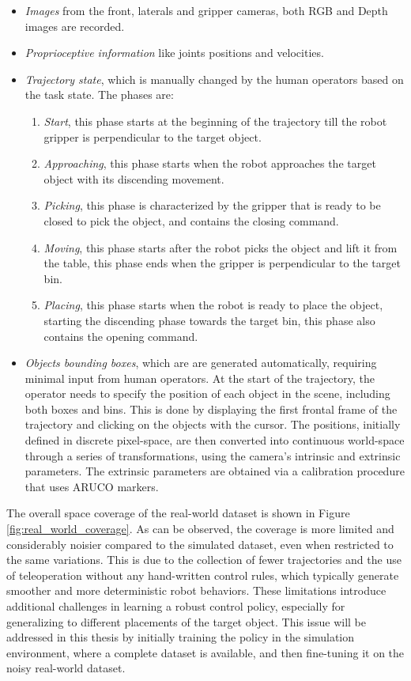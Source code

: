 \begin{itemize}
    \item \textit{Images} from the front, laterals and gripper cameras, both RGB and Depth images are recorded.
    \item \textit{Proprioceptive information} like joints positions and velocities.
    \item \textit{Trajectory state}, which is manually changed by the human operators based on the task state. The phases are:
        \begin{enumerate}
            \item \textit{Start}, this phase starts at the beginning of the trajectory till the robot gripper is perpendicular to the target object.
            \item \textit{Approaching}, this phase starts when the robot approaches the target object with its discending movement.
            \item \textit{Picking}, this phase is characterized by the gripper that is ready to be closed to pick the object, and contains the closing command.
            \item \textit{Moving}, this phase starts after the robot picks the object and lift it from the table, this phase ends when the gripper is perpendicular to the target bin.
            \item \textit{Placing}, this phase starts when the robot is ready to place the object, starting the discending phase towards the target bin, this phase also contains the opening command.
        \end{enumerate}
    \item \textit{Objects bounding boxes}, which are are generated automatically, requiring minimal input from human operators. At the start of the trajectory, the operator needs to specify the position of each object in the scene, including both boxes and bins. This is done by displaying the first frontal frame of the trajectory and clicking on the objects with the cursor. The positions, initially defined in discrete pixel-space, are then converted into continuous world-space through a series of transformations, using the camera's intrinsic and extrinsic parameters. The extrinsic parameters are obtained via a calibration procedure that uses ARUCO markers.
\end{itemize}
The overall space coverage of the real-world dataset is shown in Figure \ref{fig:real_world_coverage}. As can be observed, the coverage is more limited and considerably noisier compared to the simulated dataset, even when restricted to the same variations. This is due to the collection of fewer trajectories and the use of teleoperation without any hand-written control rules, which typically generate smoother and more deterministic robot behaviors. These limitations introduce additional challenges in learning a robust control policy, especially for generalizing to different placements of the target object. This issue will be addressed in this thesis by initially training the policy in the simulation environment, where a complete dataset is available, and then fine-tuning it on the noisy real-world dataset.

